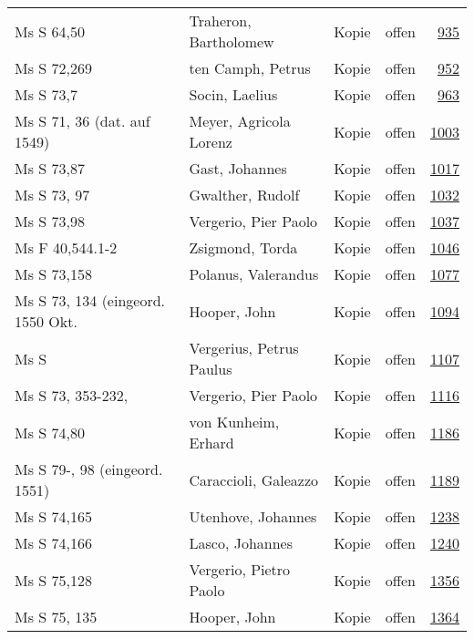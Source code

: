 \documentclass[10pt,a4paper,landscape]{report}
\begin{document}
\begin{longtable}{p{16cm}p{4cm}llr}
Ms S 64,50	&	Traheron, Bartholomew	&	Kopie	&	offen	&	\href{http://130.60.24.72/assignment/935}{935}\\
Ms S 72,269	&	ten Camph, Petrus	&	Kopie	&	offen	&	\href{http://130.60.24.72/assignment/952}{952}\\
Ms S 73,7	&	Socin, Laelius	&	Kopie	&	offen	&	\href{http://130.60.24.72/assignment/963}{963}\\
Ms S 71, 36 (dat. auf 1549)	&	Meyer, Agricola Lorenz	&	Kopie	&	offen	&	\href{http://130.60.24.72/assignment/1003}{1003}\\
Ms S 73,87	&	Gast, Johannes	&	Kopie	&	offen	&	\href{http://130.60.24.72/assignment/1017}{1017}\\
Ms S 73, 97	&	Gwalther, Rudolf	&	Kopie	&	offen	&	\href{http://130.60.24.72/assignment/1032}{1032}\\
Ms S 73,98	&	Vergerio, Pier Paolo	&	Kopie	&	offen	&	\href{http://130.60.24.72/assignment/1037}{1037}\\
Ms F 40,544.1-2	&	Zsigmond, Torda	&	Kopie	&	offen	&	\href{http://130.60.24.72/assignment/1046}{1046}\\
Ms S 73,158	&	Polanus, Valerandus	&	Kopie	&	offen	&	\href{http://130.60.24.72/assignment/1077}{1077}\\
Ms S 73, 134 (eingeord. 1550 Okt.	&	Hooper, John	&	Kopie	&	offen	&	\href{http://130.60.24.72/assignment/1094}{1094}\\
Ms S	&	Vergerius, Petrus Paulus	&	Kopie	&	offen	&	\href{http://130.60.24.72/assignment/1107}{1107}\\
Ms S 73, 353-232,	&	Vergerio, Pier Paolo	&	Kopie	&	offen	&	\href{http://130.60.24.72/assignment/1116}{1116}\\
Ms S 74,80	&	von Kunheim, Erhard	&	Kopie	&	offen	&	\href{http://130.60.24.72/assignment/1186}{1186}\\
Ms S 79-, 98 (eingeord. 1551)	&	Caraccioli, Galeazzo	&	Kopie	&	offen	&	\href{http://130.60.24.72/assignment/1189}{1189}\\
Ms S 74,165	&	Utenhove, Johannes	&	Kopie	&	offen	&	\href{http://130.60.24.72/assignment/1238}{1238}\\
Ms S 74,166	&	Lasco, Johannes	&	Kopie	&	offen	&	\href{http://130.60.24.72/assignment/1240}{1240}\\
Ms S 75,128	&	Vergerio, Pietro Paolo	&	Kopie	&	offen	&	\href{http://130.60.24.72/assignment/1356}{1356}\\
Ms S 75, 135	&	Hooper, John	&	Kopie	&	offen	&	\href{http://130.60.24.72/assignment/1364}{1364}\\

\end{longtable}
\end{document}
